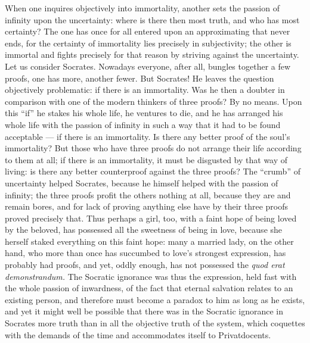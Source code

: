 \documentclass[12pt,a4paper,openany]{book}
\newcommand{\opage}[1]{\marginnote{\footnotesize\textit{[#1]}}}
\begin{document}
When one inquires objectively into immortality, another sets the passion of infinity
upon the uncertainty: where is there then most truth, and who has most certainty? The
one has once for all entered upon an approximating that never ends, for the certainty
of immortality lies precisely in subjectivity; the other is immortal and fights
precisely for that reason by striving against the uncertainty. Let us consider
Socrates. Nowadays everyone, after all, bungles together a few proofs, one has more,
another fewer. But Socrates! He leaves the question objectively problematic: if there
is an immortality. Was he then a doubter in comparison with one of the modern thinkers
of three proofs? By no means. Upon this ``if'' he stakes his whole life, he ventures
to die, and he has arranged his whole life with the passion of infinity in such a way
that it had to be found acceptable --- if there is an immortality. Is there any better
proof of the soul's immortality? But those who have three proofs do not arrange their
life according to them at all; if there is an immortality, it must be disgusted by that
way of living: is there any better counterproof against the three proofs? The
``crumb'' of uncertainty helped Socrates, because he himself helped with the passion of
infinity; the three proofs profit the others nothing at all, because they are and
remain bores, and for lack of proving anything else have by their three proofs proved
precisely that. Thus perhaps a girl, too, with a faint hope of being loved by the
beloved, has possessed all the sweetness of being in love, because she herself staked
everything on this faint hope: many a married lady, on the other hand, who more than
once has succumbed to love's strongest expression, has probably had proofs, and yet,
oddly enough, has not possessed the \textit{quod
erat demonstrandum.} The Socratic ignorance was thus the expression, held fast with
the whole passion of inwardness, of the fact
\setcounter{footnote}{0}%
\opage{187}that eternal salvation relates to an existing person, and therefore must become a
paradox to him as long as he exists, and yet it might well be possible that there was
in the Socratic ignorance in Socrates more truth than in all the objective truth of
the system, which coquettes with the demands of the time and accommodates itself to
Privatdocents.
\end{document}
